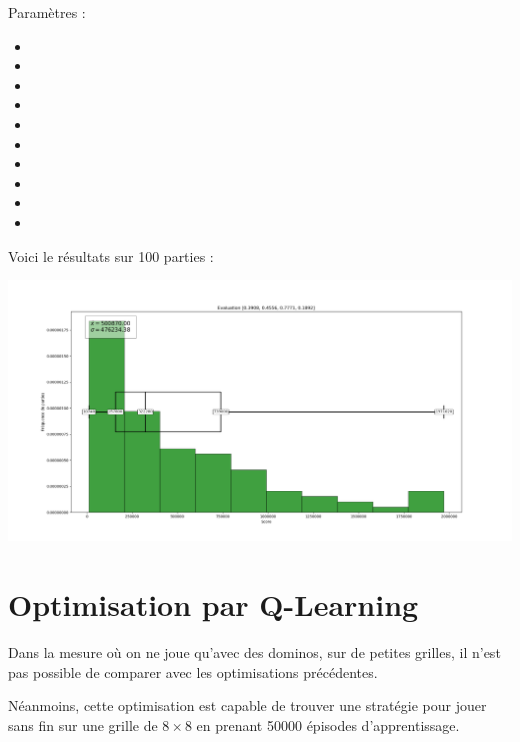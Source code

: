  Paramètres :
 
 \begin{itemize}
 	\item {}
 	\item {}
 	\item {}
 	\item {}
 	\item {}
 	\item {}
 	\item {}
 	\item {}
 	\item {}
 	\item {}
 \end{itemize} 

\medskip

Voici le résultats sur 100 parties :

\includegraphics[scale=0.35]{media/results/Stats_Eval_0,3908_0,4556_0,7771_0,1892.png}

\newpage

\section{Optimisation par Q-Learning}

Dans la mesure où on ne joue qu'avec des dominos, sur de petites grilles, il n'est pas possible de comparer avec les optimisations précédentes.

\medskip

Néanmoins, cette optimisation est capable de trouver une stratégie pour jouer sans fin sur une grille de $8\times 8$ en prenant 50000 épisodes d'apprentissage.

